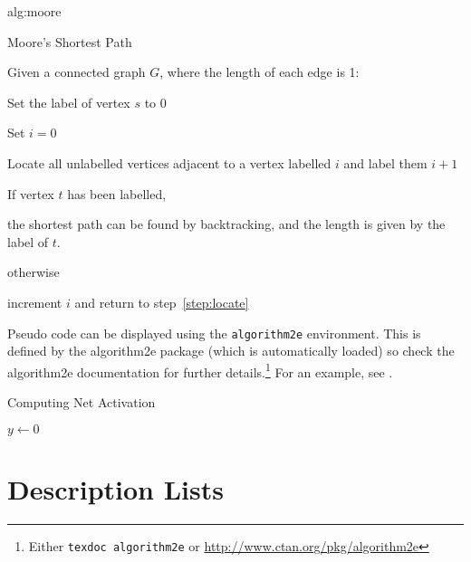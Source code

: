 \documentclass[pmlr]{jmlr}%
\begin{document}
\begin{algorithm}
\floatconts
{alg:moore}%
{\caption{Moore's Shortest Path}}%
{%
Given a connected graph $G$, where the length of each edge is 1:
\begin{enumerate*}
  \item Set the label of vertex $s$ to 0
  \item Set $i=0$
  \begin{enumerate*}
    \item \label{step:locate}Locate all unlabelled vertices 
          adjacent to a vertex labelled $i$ and label them $i+1$
    \item If vertex $t$ has been labelled,
    \begin{enumerate*}
      \item[] the shortest path can be found by backtracking, and 
      the length is given by the label of $t$.
    \end{enumerate*}
    otherwise
    \begin{enumerate*}
      \item[] increment $i$ and return to step~\ref{step:locate}
    \end{enumerate*}
  \end{enumerate*}
\end{enumerate*}
}
\end{algorithm}

Pseudo code can be displayed using the \texttt{algorithm2e}
environment. This is defined by the \textsf{algorithm2e} package
(which is automatically loaded) so check the \textsf{algorithm2e}
documentation for further details.\footnote{Either \texttt{texdoc
algorithm2e} or \url{http://www.ctan.org/pkg/algorithm2e}}
For an example, see .

\begin{algorithm2e}
\caption{Computing Net Activation}
\label{alg:net}
{}
$y\leftarrow 0$\;
\end{algorithm2e}

\section{Description Lists}
\end{document}
